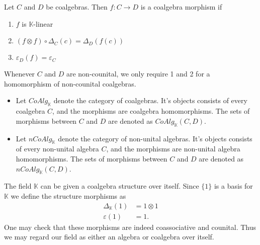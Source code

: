 \documentclass[../thesis.tex]{subfiles}
\begin{document}
            \begin{definition}
                Let $C$ and $D$ be coalgebras. Then $f:C\rightarrow D$ is a coalgebra morphism if
                \begin{enumerate}
                    \item $f$ is $\mathbb{K}$-linear
                    \item $(f\otimes f)\circ\Delta_C(c) = \Delta_D(f(c))$
                    \item $\varepsilon_D(f) = \varepsilon_C$
                \end{enumerate}
                Whenever $C$ and $D$ are non-counital, we only require 1 and 2 for a homomorphism of non-counital coalgebras.
            \end{definition}

            \begin{definition}
                \begin{itemize}
                    \item Let $CoAlg_{\mathbb{K}}$ denote the category of coalgebras. It's objects consists of every coalgebra $C$, and the morphisms are coalgebra homomorphisms. The sets of morphisms between $C$ and $D$ are denoted as $CoAlg_{\mathbb{K}}(C,D)$.
                    \item Let $nCoAlg_{\mathbb{K}}$ denote the category of non-unital algebras. It's objects consists of every non-unital algebra $C$, and the morphisms are non-unital algebra homomorphisms. The sets of morphisms between $C$ and $D$ are denoted as $nCoAlg_{\mathbb{K}}(C,D)$.
                \end{itemize}
            \end{definition}

            \begin{example}
                The field $\mathbb{K}$ can be given a coalgebra structure over itself. Since $\{1\}$ is a basis for $\mathbb{K}$ we define the structure morphisms as
                \begin{align*}
                    \Delta_{\mathbb{K}}(1) & = 1\otimes 1 \\
                    \varepsilon(1) & = 1.
                \end{align*}
                One may check that these morphisms are indeed coassociative and counital. Thus we may regard our field as either an algebra or coalgebra over itself.
            \end{example}
\end{document}
